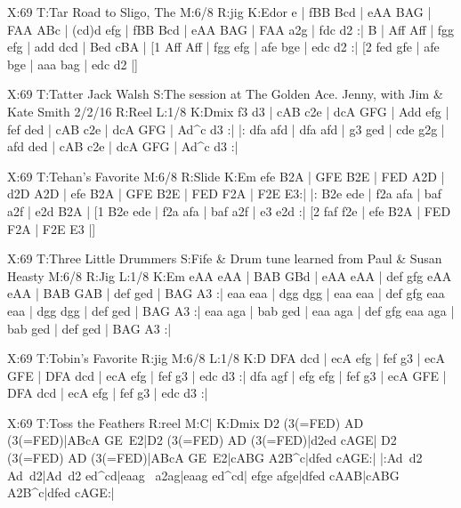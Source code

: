 \documentclass[letterpaper]{article}
\begin{document}
\begin{abc}[name]
X:69
T:Tar Road to Sligo, The
M:6/8
R:jig
K:Edor
e | fBB Bcd | eAA BAG | FAA ABc | (cd)d efg |
fBB Bcd | eAA BAG | FAA a2g | fdc d2 :|
B | Aff Aff | fgg efg | add dcd | Bed cBA |
[1 Aff Aff | fgg efg | afe bge | edc d2 :|
[2 fed gfe | afe bge | aaa bag | edc d2 |]
\end{abc}

\begin{abc}[name]
X:69
T:Tatter Jack Walsh
S:The session at The Golden Ace. Jenny, with Jim & Kate Smith  2/2/16
R:Reel
L:1/8
K:Dmix
f3 d3 | cAB c2e | dcA GFG | Add efg |
fef ded | cAB c2e | dcA GFG | Ad^c d3 :|
|: dfa afd | dfa afd | g3 ged | cde g2g |
afd ded | cAB c2e | dcA GFG | Ad^c d3 :|
\end{abc}

\begin{abc}[name]
X:69
T:Tehan's Favorite
M:6/8
R:Slide
K:Em
efe B2A | GFE B2E | FED A2D | d2D A2D |
efe B2A | GFE B2E | FED F2A | F2E E3:|
|: B2e ede | f2a afa | baf a2f | e2d B2A |
[1 B2e ede | f2a afa | baf a2f | e3 e2d :|
[2 faf f2e | efe B2A | FED F2A | F2E E3 |]
\end{abc}

\begin{abc}[name]
X:69
T:Three Little Drummers
S:Fife & Drum tune learned from Paul & Susan Heasty
M:6/8
R:Jig
L:1/8
K:Em
eAA eAA | BAB GBd | eAA eAA | def gfg
eAA eAA | BAB GAB | def ged | BAG A3 :|
eaa eaa | dgg dgg | eaa eaa | def gfg
eaa eaa | dgg dgg | def ged | BAG A3 :|
eaa aga | bab ged | eaa aga | def gfg
eaa aga | bab ged | def ged | BAG A3 :|
\end{abc}

\begin{abc}[name]
X:69
T:Tobin's Favorite
R:jig
M:6/8
L:1/8
K:D
DFA dcd | ecA efg | fef g3 | ecA GFE |
DFA dcd | ecA efg | fef g3 | edc d3 :|
dfa agf | efg efg | fef g3 | ecA GFE |
DFA dcd | ecA efg | fef g3 | edc d3 :|
\end{abc}

\begin{abc}[name]
X:69
T:Toss the Feathers
R:reel
M:C|
K:Dmix
D2 (3(=FED) AD (3(=FED)|ABcA GE~E2|D2 (3(=FED) AD (3(=FED)|d2ed cAGE|
D2 (3(=FED) AD (3(=FED)|ABcA GE~E2|cABG A2B^c|dfed cAGE:|
|:Ad~d2 Ad~d2|Ad~d2 ed^cd|eaag ~a2ag|eaag ed^cd|
efge afge|dfed cAAB|cABG A2B^c|dfed cAGE:|
\end{abc}
\end{document}
